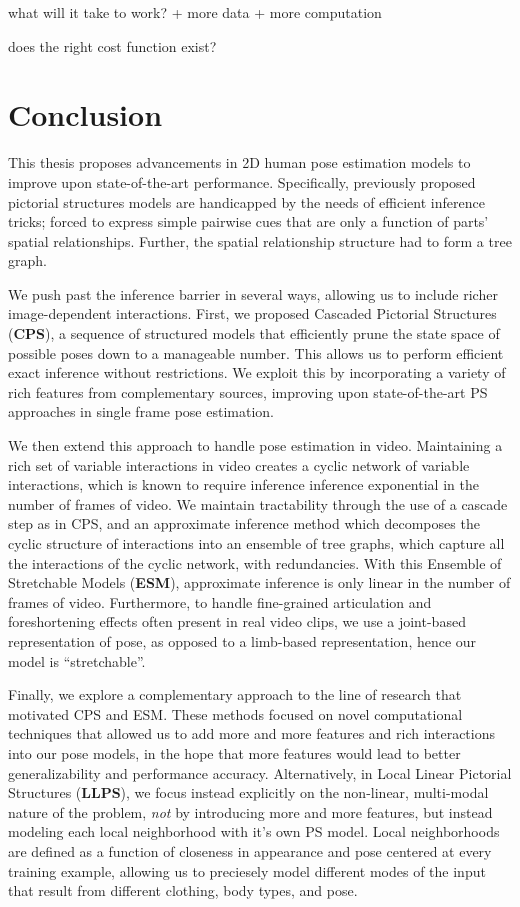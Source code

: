 what will it take to work?
  + more data
  + more computation

does the right cost function exist?

\chapter{Conclusion}

This thesis proposes advancements in 2D human pose estimation models to improve 
upon state-of-the-art performance.  Specifically, previously proposed pictorial 
structures models are handicapped by the needs of efficient inference tricks; 
forced to express simple pairwise cues that are only a function of parts' 
spatial relationships.  Further, the spatial relationship structure had to form 
a tree graph.

We push past the inference barrier in several ways, allowing us to include 
richer image-dependent interactions.  First, we proposed Cascaded Pictorial 
Structures ({\bf CPS}), a sequence of structured models that efficiently prune 
the state space of possible poses down to a manageable number.  This allows us 
to perform efficient exact inference without restrictions.  We exploit this by 
incorporating a variety of rich features from complementary sources, improving 
upon state-of-the-art PS approaches in single frame pose estimation.

We then extend this approach to handle pose estimation in video.  Maintaining a 
rich set of variable interactions in video creates a cyclic network of variable 
interactions, which is known to require inference inference exponential in the 
number of frames of video.  We maintain tractability through the use of a 
cascade step as in CPS, and an approximate inference method which decomposes 
the cyclic structure of interactions into an ensemble of tree graphs, which 
capture all the interactions of the cyclic network, with redundancies.  With 
this Ensemble of Stretchable Models ({\bf ESM}), approximate inference is only 
linear in the number of frames of video.  Furthermore, to handle fine-grained 
articulation and foreshortening effects often present in real video clips, we 
use a joint-based representation of pose, as opposed to a limb-based 
representation, hence our model is ``stretchable''.

Finally, we explore a complementary approach to the line of research that 
motivated CPS and ESM.  These methods focused on novel computational techniques 
that allowed us to add more and more features and rich interactions into our 
pose models, in the hope that more features would lead to better 
generalizability and performance accuracy.  Alternatively, in Local Linear 
Pictorial Structures ({\bf LLPS}), we focus instead explicitly on the 
non-linear, multi-modal nature of the problem, {\em not} by introducing more 
and more features, but instead modeling each local neighborhood with it's own 
PS model.  Local neighborhoods are defined as a function of closeness in 
appearance and pose centered at every training example, allowing us to 
preciesely model different modes of the input that result from different 
clothing, body types, and pose.

